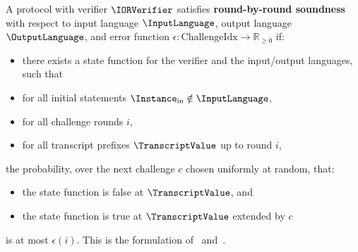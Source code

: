 \begin{definition}
    \label{def:round_by_round_soundness}
    A protocol with verifier \(\IORVerifier\) satisfies \textbf{round-by-round soundness} with respect to input language
    \(\InputLanguage\), output language \(\OutputLanguage\), and error function \(\epsilon: \text{ChallengeIdx} \to \mathbb{R}_{\geq 0}\) if:
    \begin{itemize}
        \item there exists a state function for the verifier and the input/output languages, such that
        \item for all initial statements \(\Instance_{\text{in}} \notin \InputLanguage\),
        \item for all challenge rounds \(i\),
        \item for all transcript prefixes \(\TranscriptValue\) up to round \(i\),
    \end{itemize}
    the probability, over the next challenge \(c\) chosen uniformly at random, that:
    \begin{itemize}
        \item the state function is false at \(\TranscriptValue\), and
        \item the state function is true at \(\TranscriptValue\) extended by \(c\)
    \end{itemize}
    is at most \(\epsilon(i)\). This is the formulation of~\cite{CCHLRRW19} and~\cite{ABF26}.
    \leanok
\end{definition}

